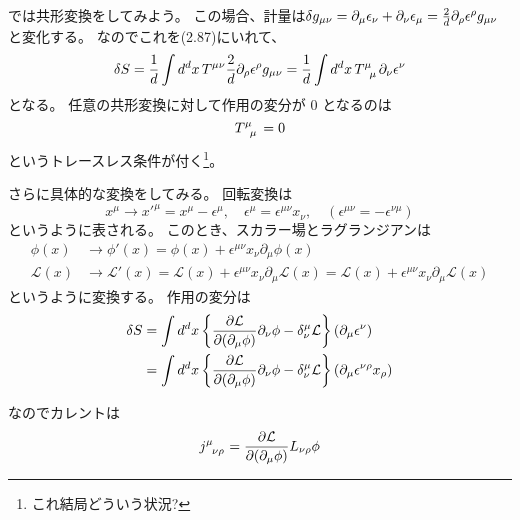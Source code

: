 \documentclass[../../master.tex]{subfiles}
\begin{document}
では共形変換をしてみよう。
この場合、計量は\(\var{g_{\mu\nu}}=\partial_\mu\epsilon_\nu+\partial_\nu\epsilon_\mu=\frac{2}{d}\partial_\rho \epsilon^\rho g_{\mu\nu}\)と変化する。
なのでこれを(2.87)にいれて、
\begin{equation}
    \var{S}
    = \frac{1}{d} \int d^dx\, T^{\mu\nu}\frac{2}{d}\partial_\rho \epsilon^\rho g_{\mu\nu}
    = \frac{1}{d}\int d^dx\, T\indices{^\mu_\mu}\partial_\nu\epsilon^\nu
\end{equation}
となる。
任意の共形変換に対して作用の変分が 0 となるのは
\begin{equation}
    T\indices{^\mu_\mu} =0
\end{equation}
というトレースレス条件が付く\footnote{これ結局どういう状況?}。

さらに具体的な変換をしてみる。
回転変換は
\begin{equation}
    x^\mu\rightarrow x'^\mu = x^\mu -\epsilon^\mu,\quad \epsilon^\mu = \epsilon^{\mu\nu}x_\nu, \quad(\epsilon^{\mu\nu}= - \epsilon^{\nu\mu})
\end{equation}
というように表される。
このとき、スカラー場とラグランジアンは
\begin{align}
    \phi(x)&\rightarrow \phi'(x) = \phi(x) + \epsilon^{\mu\nu}x_\nu\partial_\mu\phi(x)\\
    \mathcal{L}(x)&\rightarrow \mathcal{L}'(x)
    = \mathcal{L}(x) + \epsilon^{\mu\nu}x_\nu\partial_\mu\mathcal{L}(x)
    = \mathcal{L}(x) + \epsilon^{\mu\nu}x_\nu\partial_\mu\mathcal{L}(x)
\end{align}
というように変換する。
作用の変分は
\begin{align*}
    \var{S}
    &= \int d^dx\, \qty{\pdv{\mathcal{L}}{(\partial_\mu\phi)}\partial_\nu\phi - \delta_\nu^\mu \mathcal{L}}(\partial_\mu \epsilon^\nu)\\
    &= \int d^dx\, \qty{\pdv{\mathcal{L}}{(\partial_\mu\phi)}\partial_\nu\phi - \delta_\nu^\mu \mathcal{L}}(\partial_\mu \epsilon^{\nu\rho}x_\rho)\\
\end{align*}


なのでカレントは
\begin{align}
    j\indices{^\mu_\nu_\rho} = \pdv{\mathcal{L}}{(\partial_\mu \phi)} L_{\nu\rho}\phi
\end{align}
\end{document}
